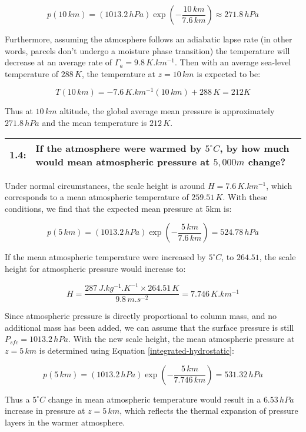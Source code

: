 \documentclass[12pt]{article}
\newcommand*{\problem}[2]{
    \begin{table}[ht]
    \centering
        \begin{tabular}{ | p{.1\linewidth} p{.9\linewidth} | }
            \hline
            \vspace{.3em}\textbf{\large#1:} & \vspace{.3em}\small{#2}\hspace{.2em}\vspace{.5em} \\ \hline
        \end{tabular}
    \end{table}
}
\begin{document}
\[
    p(10\,\si{km}) = (1013.2\,\si{hPa})\exp\left(-\frac{10\,\si{km}}{7.6\,\si{km}}\right) \approx 271.8\,\si{hPa}
\]

Furthermore, assuming the atmosphere follows an adiabatic lapse rate (in other words, parcels don't undergo a moisture phase transition) the temperature will decrease at an average rate of $\Gamma_a = 9.8\,\si{K.km^{-1}}$. Then with an average sea-level temperature of $288\,\si{K}$, the temperature at $z=10\,\si{km}$ is expected to be:

\[
    T(10\,\si{km}) = -7.6\,\si{K.km^{-1}}(10\,\si{km}) + 288\,\si{K} = 212K
\]

Thus at $10\,\si{km}$ altitude, the global average mean pressure is approximately $271.8\,\si{hPa}$ and the mean temperature is $212\,\si{K}$.

\problem{1.4}{If the atmosphere were warmed by $5^\circ \si{C}$, by how much would mean atmospheric pressure at $5,000m$ change?}

Under normal circumstances, the scale height is around $H=7.6\,\si{K.km^{-1}}$, which corresponds to a mean atmospheric temperature of $259.51\,\si{K}$. With these conditions, we find that the expected mean pressure at 5km is:

\[
    p(5\,\si{km}) = (1013.2\,\si{hPa})\exp\left(-\frac{5\,\si{km}}{7.6\,\si{km}}\right) = 524.78\,\si{hPa}
\]

If the mean atmospheric temperature were increased by $5^\circ \si{C}$, to $264.51$, the scale height for atmospheric pressure would increase to:

\[
    H = \frac{287\,\si{J.kg^{-1}.K^{-1}} \times 264.51\,\si{K}}{9.8\,\si{m.s^{-2}}} = 7.746\,\si{K.km^{-1}}
\]

Since atmospheric pressure is directly proportional to column mass, and no additional mass has been added, we can assume that the surface pressure is still $P_{sfc}=1013.2\,\si{hPa}$. With the new scale height, the mean atmospheric pressure at $z=5\,\si{km}$ is determined using Equation \ref{integrated-hydrostatic}:

\[
    p(5\,\si{km}) = (1013.2\,\si{hPa})\exp\left(-\frac{5\,\si{km}}{7.746\,\si{km}}\right) = 531.32\,\si{hPa}
\]

Thus a $5^\circ \si{C}$ change in mean atmospheric temperature would result in a $6.53\,\si{hPa}$ increase in pressure at $z=5\,\si{km}$, which reflects the thermal expansion of pressure layers in the warmer atmosphere.

\newpage
\end{document}
